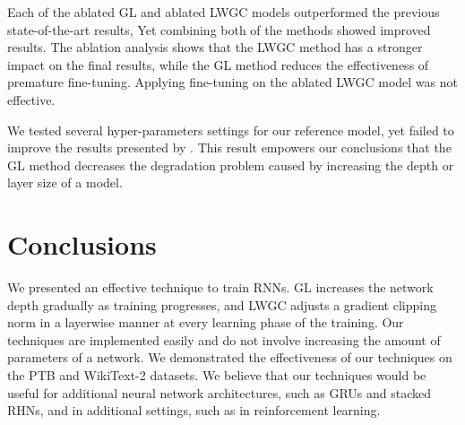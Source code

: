 \documentclass{article}
\begin{document}
Each of the ablated GL and ablated LWGC models outperformed the previous state-of-the-art results, Yet combining both of the methods showed improved results.
The ablation analysis shows that the LWGC method has a stronger impact on the final results, while the GL method reduces the effectiveness of premature fine-tuning. Applying fine-tuning on the ablated LWGC model was not effective.  

We tested several hyper-parameters settings for our reference model, yet failed to improve the results presented by \cite{mos}. This result empowers our conclusions that the GL method decreases the degradation problem caused by increasing the depth or layer size of a model. 

\section{Conclusions}
We presented an effective technique to train RNNs. GL increases the network depth gradually as training progresses, and LWGC adjusts a gradient clipping norm in a layerwise manner at every learning phase of the training. Our techniques are implemented easily and do not involve increasing the amount of parameters of a network. We demonstrated the effectiveness of our techniques on the PTB and WikiText-2 datasets. We believe that our techniques would be useful for additional neural network architectures, such as GRUs and stacked RHNs, and in additional settings, such as in reinforcement learning.

\medskip

\small




\end{document}
